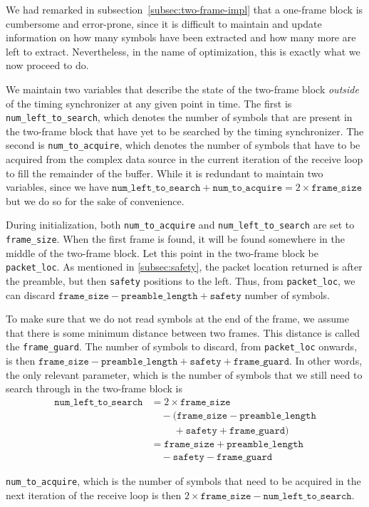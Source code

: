 We had remarked in subsection~\ref{subsec:two-frame-impl} that a one-frame
block is cumbersome and error-prone, since it is difficult to maintain and
update information on how many symbols have been extracted and how many more
are left to extract. Nevertheless, in the name of optimization, this is
exactly what we now proceed to do.

\begin{sloppypar}
We maintain two variables that describe the state of the two-frame block
\emph{outside} of the timing synchronizer at any given point in time. The first
is \texttt{num\_left\_to\_search}, which denotes the number of symbols that
are present in the two-frame block that have yet to be searched by the timing
synchronizer. The second is \verb+num_to_acquire+, which denotes the number of
symbols that have to be acquired from the complex data source in the current
iteration of the receive loop to fill the remainder of the buffer. While it is
redundant to maintain two variables, since we have
$\texttt{num\_left\_to\_search} + \texttt{num\_to\_acquire} = 2 \times
\texttt{frame\_size}$ but we do so for the sake of convenience.
\end{sloppypar}

During initialization, both \verb+num_to_acquire+ and \verb+num_left_to_search+
are set to \verb+frame_size+. When the first frame is found, it will be found
somewhere in the middle of the two-frame block. Let this point in the two-frame
block be \verb+packet_loc+. As mentioned in \ref{subsec:safety}, the packet
location returned is after the preamble, but then \verb+safety+ positions to
the left. Thus, from \verb+packet_loc+, we can discard $\texttt{frame\_size}
- \texttt{preamble\_length} + \texttt{safety}$ number of symbols.

To make sure that we do not read symbols at the end of the frame, we assume
that there is some minimum distance between two frames. This distance is called
the \verb+frame_guard+. The number of symbols to discard, from
\verb+packet_loc+ onwards, is then $\texttt{frame\_size}
- \texttt{preamble\_length} + \texttt{safety} + \texttt{frame\_guard}$. In
other words, the only relevant parameter, which is the number of symbols that
we still need to search through in the two-frame block is
\begin{equation}
	\begin{split}
		\texttt{num\_left\_to\_search} &= 2 \times \texttt{frame\_size} \\
		                               & \quad - (\texttt{frame\_size} - \texttt{preamble\_length} \\
		                               & \quad \quad \; + \texttt{safety} + \texttt{frame\_guard}) \\
		                               &= \texttt{frame\_size} + \texttt{preamble\_length} \\
		                               & \quad - \texttt{safety} - \texttt{frame\_guard}
	\end{split}
\end{equation}

\verb+num_to_acquire+, which is the number of symbols that need to be acquired
in the next iteration of the receive loop is then
$2 \times \texttt{frame\_size} - \texttt{num\_left\_to\_search}$.
